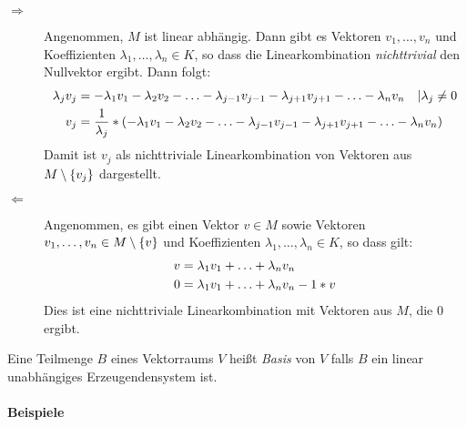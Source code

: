 \begin{description}
  \newcommand{\lv}[1]{\ensuremath\lambda_{#1}v_{#1}}
  \item[\glqq$\Rightarrow$\grqq] Angenommen, $M$ ist linear abhängig. Dann gibt es Vektoren $v_1,\ldots,v_n$ und Koeffizienten $\lambda_1,\ldots,\lambda_n \in K$, so dass die Linearkombination \emph{nichttrivial} den Nullvektor ergibt. Dann folgt:
  \begin{align*}
    \lv{j} &= -\lv{1}-\lv{2}-\ldots-\lv{j-1}-\lv{j+1}-\ldots-\lv{n} \quad |\lambda_j\neq0\\
    v_j &= \frac{1}{\lambda_j} * \left( -\lv{1}-\lv{2}-\ldots-\lv{j-1}-\lv{j+1}-\ldots-\lv{n} \right)
  \end{align*}
  Damit ist $v_j$ als nichttriviale Linearkombination von Vektoren aus $M\setminus\left\{ v_j \right\}$ dargestellt.


  \item[\glqq$\Leftarrow$\grqq] Angenommen, es gibt einen Vektor $v\in M$ sowie Vektoren $v_1,\ldots,v_n\in M\setminus\left\{ v \right\}$ und Koeffizienten $\lambda_1,\ldots,\lambda_n \in K$, so dass gilt:
  \begin{align*}
    v &= \lv{1}+\ldots+\lv{n}\\
    0 &= \lv{1}+\ldots+\lv{n} - 1*v
  \end{align*}
  Dies ist eine nichttriviale Linearkombination mit Vektoren aus $M$, die $0$ ergibt.
\end{description}


Eine Teilmenge $B$ eines Vektorraums $V$ heißt \emph{Basis} von $V$ falls $B$ ein linear unabhängiges Erzeugendensystem ist.

\paragraph{Beispiele}
